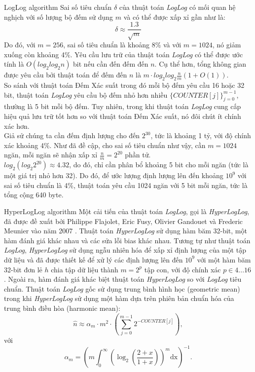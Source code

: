 \documentclass[10pt]{beamer}
\begin{document}
\begin{frame}{LogLog algorithm}
Sai số tiêu chuẩn $\delta$ của thuật toán \textit{LogLog} có mối quan hệ nghịch với số lượng bộ đếm sử dụng $m$ và có thể được xấp xỉ gần như là:
\[\delta \approx \frac{1.3}{\sqrt{m}}\]
Do đó, với $m = 256$, sai số tiêu chuẩn là khoảng 8\% và với $m = 1024$, nó giảm xuống còn khoảng 4\%.
\indent Yêu cầu lưu trữ của thuật toán \textit{LogLog} có thể được ước tính là $O(log_2log_2n)$ bit nếu cần đến đếm đến $n$. Cụ thể hơn, 
tổng không gian được yêu cầu bởi thuật toán để đếm đến $n$ là $m\cdot log_2log_2\frac{n}{m}(1 + O(1))$.\\
So sánh với thuật toán Đếm Xác suất trong đó mỗi bộ đếm yêu cầu 16 hoặc 32 bit, thuật toán \textit{LogLog} yêu cầu bộ đếm nhỏ hơn 
nhiều $\{COUNTER[j]\}_{j=0}^{m-1}$, thường là 5 bit mỗi bộ đếm. Tuy nhiên, trong khi thuật toán \textit{LogLog} cung cấp hiệu quả lưu trữ tốt hơn 
so với thuật toán Đếm Xác suất, nó đôi chút ít chính xác hơn.\\
Giả sử chúng ta cần đếm định lượng cho đến $2^{30}$, tức là khoảng 1 tỷ, với độ chính xác khoảng 4\%. Như đã đề cập, cho sai số tiêu chuẩn như vậy, 
cần $m = 1024$ ngăn, mỗi ngăn sẽ nhận xấp xỉ $\frac{n}{m} = 2^{20}$ phần tử.\\
$log_2\left(log_{2}2^{20}\right) \approx 4.32$, do đó, chỉ cần phân bổ khoảng 5 bit cho mỗi ngăn (tức là một giá trị nhỏ hơn 32). 
Do đó, để ước lượng định lượng lên đến khoảng $10^9$ với sai số tiêu chuẩn là 4\%, thuật toán yêu cầu 1024 ngăn với 5 bit mỗi ngăn, 
tức là tổng cộng 640 byte.
\end{frame}
\begin{frame}{HyperLogLog algorithm}
  Một cải tiến của thuật toán \textit{LogLog}, gọi là \textit{HyperLogLog}, đã được đề xuất bởi Philippe Flajolet, Eric Fusy, Olivier Gandouet và 
  Frederic Meunier vào năm 2007 \cite{flajolet2007hyperloglog}. Thuật toán \textit{HyperLogLog} sử dụng hàm băm 32-bit, một hàm đánh giá khác nhau và các sửa lỗi bias khác nhau.
  Tương tự như thuật toán \textit{LogLog}, \textit{HyperLogLog} sử dụng ngẫu nhiên hóa để xấp xỉ định lượng của một tập dữ liệu và đã được 
  thiết kế để xử lý các định lượng lên đến $10^9$ với một hàm băm 32-bit đơn lẻ $h$ chia tập dữ liệu thành $m = 2^p$ tập con, với độ chính xác $p \in 4...16$.
  Ngoài ra, hàm đánh giá khác biệt thuật toán \textit{HyperLogLog} so với \textit{LogLog} tiêu chuẩn. Thuật toán \textit{LogLog} gốc sử dụng 
  trung bình hình học (geometric mean) trong khi \textit{HyperLogLog} sử dụng một hàm dựa trên phiên bản chuẩn hóa của trung bình điều hòa (harmonic mean):
  \[
      \hat{n} \approx \alpha_m \cdot m^2 \cdot \left(\sum_{j=0}^{m-1}2^{-COUNTER[j]}\right),
  \]
  \indent với
  \[
      \alpha_m = \left(m\int_0^\infty\left(\log_2\left(\frac{2+x}{1+x}\right)\right)^m\text{dx}\right)^{-1}.    
  \]
\end{frame}
\end{document}
